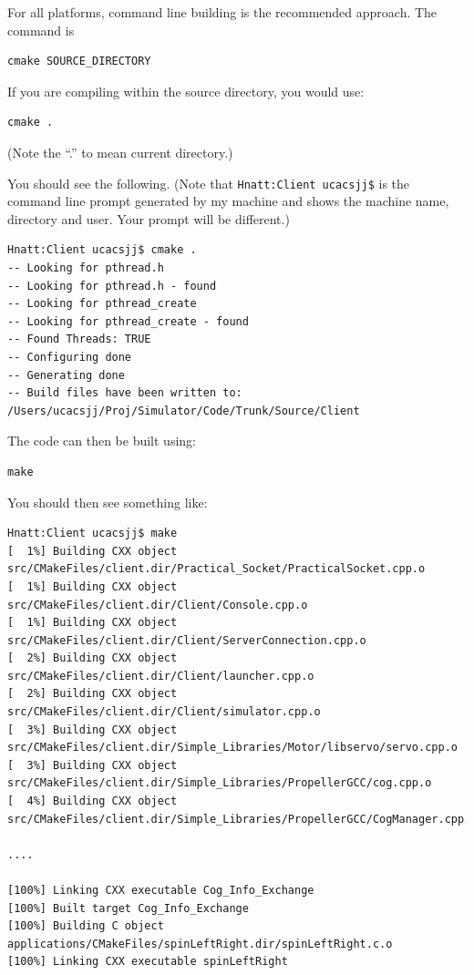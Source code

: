 \documentclass[a4paper]{article}
\begin{document}
For all platforms, command line building is the recommended approach. The
command is

\begin{verbatim}
cmake SOURCE_DIRECTORY
\end{verbatim}

If you are compiling within the source directory, you would use:

\begin{verbatim}
cmake .
\end{verbatim}

(Note the ``.'' to mean current directory.)

You should see the following. (Note that \verb+Hnatt:Client ucacsjj$+ is the
command line prompt generated by my machine and shows the machine name,
directory and user. Your prompt will be different.)

\begin{verbatim}
Hnatt:Client ucacsjj$ cmake .
-- Looking for pthread.h
-- Looking for pthread.h - found
-- Looking for pthread_create
-- Looking for pthread_create - found
-- Found Threads: TRUE  
-- Configuring done
-- Generating done
-- Build files have been written to: /Users/ucacsjj/Proj/Simulator/Code/Trunk/Source/Client
\end{verbatim}

The code can then be built using:

\begin{verbatim}
make
\end{verbatim}

You should then see something like:

\begin{verbatim}
Hnatt:Client ucacsjj$ make
[  1%] Building CXX object src/CMakeFiles/client.dir/Practical_Socket/PracticalSocket.cpp.o
[  1%] Building CXX object src/CMakeFiles/client.dir/Client/Console.cpp.o
[  1%] Building CXX object src/CMakeFiles/client.dir/Client/ServerConnection.cpp.o
[  2%] Building CXX object src/CMakeFiles/client.dir/Client/launcher.cpp.o
[  2%] Building CXX object src/CMakeFiles/client.dir/Client/simulator.cpp.o
[  3%] Building CXX object src/CMakeFiles/client.dir/Simple_Libraries/Motor/libservo/servo.cpp.o
[  3%] Building CXX object src/CMakeFiles/client.dir/Simple_Libraries/PropellerGCC/cog.cpp.o
[  4%] Building CXX object src/CMakeFiles/client.dir/Simple_Libraries/PropellerGCC/CogManager.cpp.o

....

[100%] Linking CXX executable Cog_Info_Exchange
[100%] Built target Cog_Info_Exchange
[100%] Building C object applications/CMakeFiles/spinLeftRight.dir/spinLeftRight.c.o
[100%] Linking CXX executable spinLeftRight

\end{verbatim}
\end{document}
